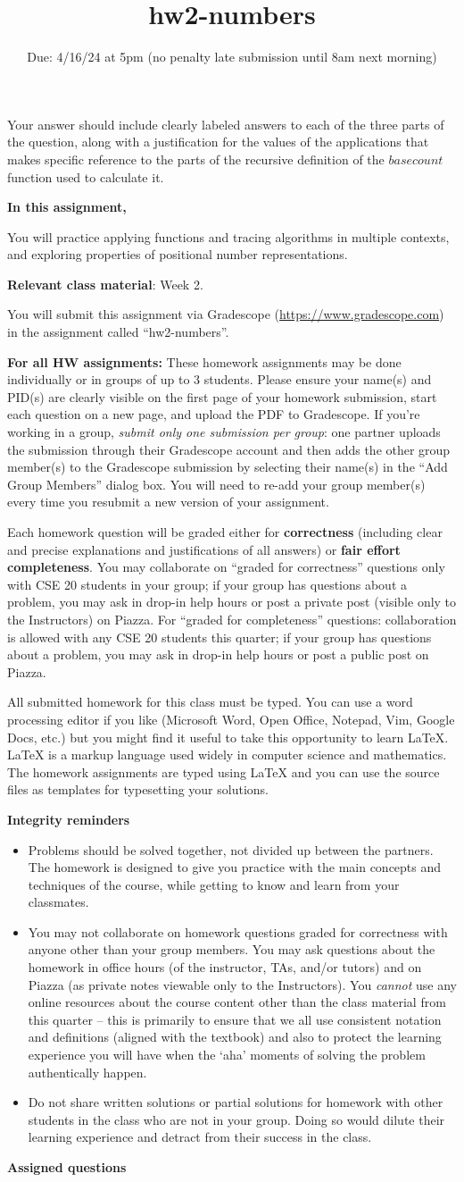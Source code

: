 \documentclass[12pt, oneside]{article}
\newcommand{\instructions}{{\bf For all HW assignments:} 
These homework assignments may be done individually or in groups of up to 3 students.
Please ensure your name(s) and PID(s)
are clearly visible on the first page of your homework
submission, start each question on a new page, and upload the PDF to Gradescope.
If you're working in a group, {\it submit only one submission per group}: one partner uploads the
submission through their Gradescope account and then adds the other group member(s) to the Gradescope submission
by selecting their name(s) in the ``Add Group Members'' dialog box. You will need to re-add your group member(s)
every time you resubmit a new version of your assignment.

Each homework question will be graded either for
{\bf correctness} (including clear and precise explanations and justifications of all answers) or
{\bf fair effort completeness}. You may collaborate on ``graded for correctness''
questions only with CSE 20 students in your group; if your
 group has questions about a problem, you may ask in drop-in help hours or post a private
post (visible only to the Instructors) on Piazza.  
 For ``graded for completeness''
 questions: collaboration is allowed with any CSE 20 students this quarter; 
 if your group has questions about a problem, you may ask in drop-in 
 help hours or post a public post on Piazza.

All submitted homework for this class must be typed. 
You can use a word processing editor if you like (Microsoft Word, Open Office, Notepad, Vim, Google Docs, etc.) 
but you might find it useful to take this opportunity to learn LaTeX. 
LaTeX is a markup language used widely in computer science and mathematics. 
The homework assignments are typed using LaTeX and you can use the source files 
as templates for typesetting your solutions.

{\bf Integrity reminders}
\begin{itemize}
\item Problems should be solved together, not divided up between the partners. The homework is
designed to give you practice with the main concepts and techniques of the course, 
while getting to know and learn from your classmates.
\item You may not collaborate on homework questions graded for correctness with anyone other than your group members.
You may ask questions about the homework in office hours (of the instructor, TAs, and/or tutors) and 
on Piazza (as private notes viewable only to the Instructors).  
You \emph{cannot} use any online resources about the course content other than the class material 
from this quarter -- this is primarily to ensure that we all use consistent notation and
definitions (aligned with the textbook) and also to protect the learning experience you will have when
the `aha' moments of solving the problem authentically happen.
\item Do not share written solutions or partial solutions for homework with 
other students in the class who are not in your group. Doing so would dilute their learning 
experience and detract from their success in the class.
\end{itemize}

}
\begin{document}
\begin{enumerate}[labelindent=0pt, leftmargin=0pt]
\begin{enumerate}
Your answer should include clearly labeled answers to each of the three parts of the question, 
along with a justification for the values of the applications that makes specific reference to 
the parts of the recursive definition of the $basecount$ function used to calculate it.
\end{enumerate}
\end{enumerate}
\newpage

\title{hw2-numbers}
\date{Due: 4/16/24 at 5pm (no penalty late submission until 8am next morning)}

\maketitle
\thispagestyle{fancy}


{\bf In this assignment,}

You will practice applying functions and tracing algorithms in multiple contexts, 
and exploring properties of positional number representations.

{\bf Relevant class material}: Week 2.

You will submit this assignment via Gradescope
(\href{https://www.gradescope.com}{https://www.gradescope.com}) 
in the assignment called ``hw2-numbers''.

\instructions

{\bf Assigned questions}
\end{document}
